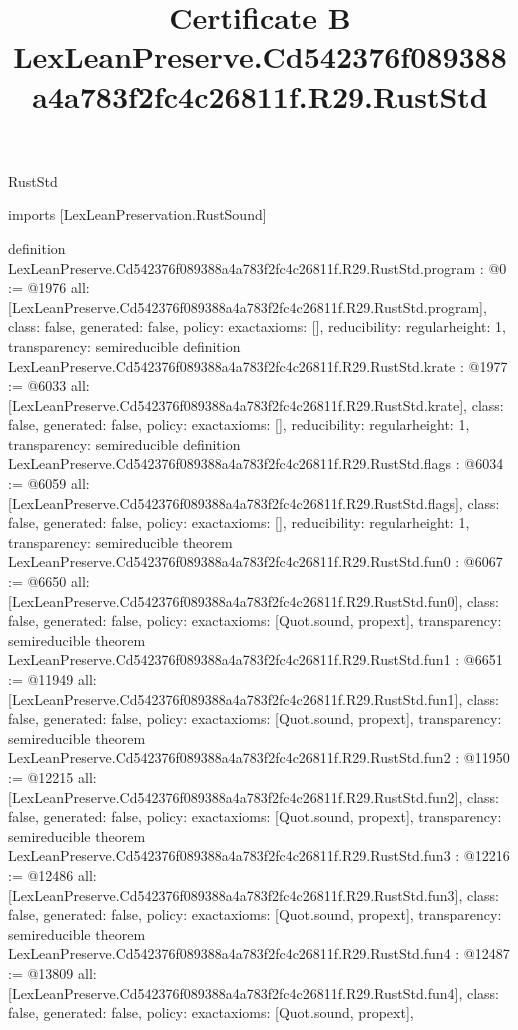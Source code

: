 \begin{lexlean}{RustStd}
\title{Certificate B LexLeanPreserve.Cd542376f089388a4a783f2fc4c26811f.R29.RustStd}
\begin{coremodule}
imports [LexLeanPreservation.RustSound]

definition LexLeanPreserve.Cd542376f089388a4a783f2fc4c26811f.R29.RustStd.program : @0 := @1976 {
  all: [LexLeanPreserve.Cd542376f089388a4a783f2fc4c26811f.R29.RustStd.program],
  class: false,
  generated: false,
  policy: exact{axioms: []},
  reducibility: regular{height: 1},
  transparency: semireducible
}
definition LexLeanPreserve.Cd542376f089388a4a783f2fc4c26811f.R29.RustStd.krate : @1977 := @6033 {
  all: [LexLeanPreserve.Cd542376f089388a4a783f2fc4c26811f.R29.RustStd.krate],
  class: false,
  generated: false,
  policy: exact{axioms: []},
  reducibility: regular{height: 1},
  transparency: semireducible
}
definition LexLeanPreserve.Cd542376f089388a4a783f2fc4c26811f.R29.RustStd.flags : @6034 := @6059 {
  all: [LexLeanPreserve.Cd542376f089388a4a783f2fc4c26811f.R29.RustStd.flags],
  class: false,
  generated: false,
  policy: exact{axioms: []},
  reducibility: regular{height: 1},
  transparency: semireducible
}
theorem LexLeanPreserve.Cd542376f089388a4a783f2fc4c26811f.R29.RustStd.fun0 : @6067 := @6650 {
  all: [LexLeanPreserve.Cd542376f089388a4a783f2fc4c26811f.R29.RustStd.fun0],
  class: false,
  generated: false,
  policy: exact{axioms: [Quot.sound, propext]},
  transparency: semireducible
}
theorem LexLeanPreserve.Cd542376f089388a4a783f2fc4c26811f.R29.RustStd.fun1 : @6651 := @11949 {
  all: [LexLeanPreserve.Cd542376f089388a4a783f2fc4c26811f.R29.RustStd.fun1],
  class: false,
  generated: false,
  policy: exact{axioms: [Quot.sound, propext]},
  transparency: semireducible
}
theorem LexLeanPreserve.Cd542376f089388a4a783f2fc4c26811f.R29.RustStd.fun2 : @11950 := @12215 {
  all: [LexLeanPreserve.Cd542376f089388a4a783f2fc4c26811f.R29.RustStd.fun2],
  class: false,
  generated: false,
  policy: exact{axioms: [Quot.sound, propext]},
  transparency: semireducible
}
theorem LexLeanPreserve.Cd542376f089388a4a783f2fc4c26811f.R29.RustStd.fun3 : @12216 := @12486 {
  all: [LexLeanPreserve.Cd542376f089388a4a783f2fc4c26811f.R29.RustStd.fun3],
  class: false,
  generated: false,
  policy: exact{axioms: [Quot.sound, propext]},
  transparency: semireducible
}
theorem LexLeanPreserve.Cd542376f089388a4a783f2fc4c26811f.R29.RustStd.fun4 : @12487 := @13809 {
  all: [LexLeanPreserve.Cd542376f089388a4a783f2fc4c26811f.R29.RustStd.fun4],
  class: false,
  generated: false,
  policy: exact{axioms: [Quot.sound, propext]},
}
\end{coremodule}
\end{lexlean}
